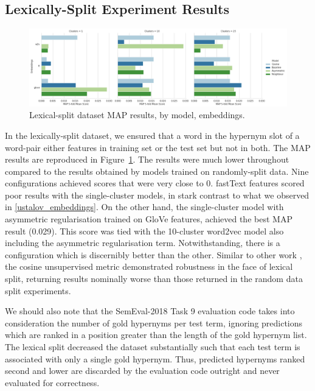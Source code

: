 \subsection{Lexically-Split Experiment Results}
\begin{figure}[ht!] 
  \centering
  \includegraphics[width=1.\linewidth]{images/MAP_lexical_split_results_models_baseline_embeddings.png}
  \caption{Lexical-split dataset \ac{MAP} results, by model, embeddings.}
  \label{fig:lexsplit_ustalov_map}
\end{figure}
In the lexically-split dataset, we ensured that a word in the hypernym slot of a word-pair either features in training set or the test set but not in both.  The \ac{MAP} results are reproduced in Figure~\ref{fig:lexsplit_ustalov_map}.  The results were much lower throughout compared to the results obtained by models trained on randomly-split data.  Nine configurations achieved scores that were very close to 0.  fastText features scored poor results with the single-cluster models, in stark contrast to what we observed in \cref{ustalov_embeddings}.  On the other hand, the single-cluster model with asymmetric regularisation trained on GloVe features, achieved the best \ac{MAP} result (0.029).  This score was tied with the 10-cluster word2vec model also including the asymmetric regularisation term.  Notwithstanding, there is a configuration which is discernibly better than the other.  Similar to other work \citep{shwartz2017siege}, the cosine unsupervised metric demonstrated robustness in the face of lexical split, returning results nominally worse than those returned in the random data split experiments.

We should also note that the SemEval-2018 Task 9 evaluation code takes into consideration the number of gold hypernyms per test term, ignoring predictions which are ranked in a position greater than the length of the gold hypernym list.  The lexical split decreased the dataset substantially such that each test term is associated with only a single gold hypernym.  Thus, predicted hypernyms ranked second and lower are discarded by the evaluation code outright and never evaluated for correctness.  

